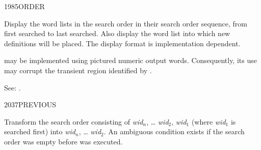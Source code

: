 \begin{newword}{1985}{ORDER}
	\stack{}{}

	Display the word lists in the search order in their search order
	sequence, from first searched to last searched. Also display the
	word list into which new definitions will be placed. The display
	format is implementation dependent.

	 may be implemented using pictured numeric output
	words. Consequently, its use may corrupt the transient region
	identified by .

\item[See:]
	.
\end{newword}


\begin{newword}{2037}{PREVIOUS}
	\stack{}{}

	Transform the search order consisting of \emph{wid}$_n$, {\ldots}
	\emph{wid}$_2$, \emph{wid}$_1$ (where \emph{wid}$_1$ is searched
	first) into \emph{wid}$_n$, {\ldots} \emph{wid}$_2$. An ambiguous
	condition exists if the search order was empty before
	 was executed.
\end{newword}

